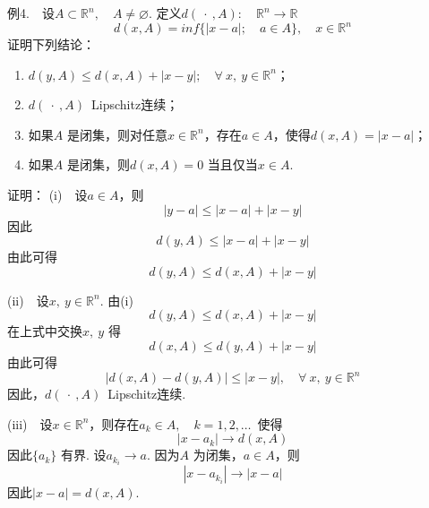 \documentclass{article}
\begin{document}
\newpage

例4.\ \ 设\(A \subset \mathbb{R}^n,\quad A \neq \varnothing \). 定义\(d(\ \cdot\ ,A):\quad \mathbb{R}^n \to \mathbb{R}\)
\begin{equation*}
    d(x,A) = inf \{| x - a |;\quad a \in A \},\quad x \in \mathbb{R}^n
\end{equation*}
证明下列结论：
\begin{enumerate}
    \item \(d(y,A) \le d(x,A) + | x - y |;\quad \forall\ x,\ y \in \mathbb{R}^n \)；
    \item \(d(\ \cdot\ ,A)\)\ Lipschitz连续；
    \item 如果\(A\) 是闭集，则对任意\(x \in \mathbb{R}^n\)，存在\(a \in A\)，使得\(d(x,A) = | x - a | \)；
    \item 如果\(A\) 是闭集，则\(d(x,A) = 0\) 当且仅当\(x \in A\).
\end{enumerate}

\vspace{10pt}

证明：\newline
(i)\ \ 设\(a \in A\)，则
\begin{equation*}
    | y - a | \le | x - a |+ | x - y |
\end{equation*}
因此
\begin{equation*}
    d(y,A) \le | x - a |+ | x - y |
\end{equation*}
由此可得
\begin{equation*}
    d(y,A) \le d(x,A) + | x - y |
\end{equation*}

(ii)\ \ 设\(x,\ y \in \mathbb{R}^n\). 由(i)
\begin{equation*}
    d(y,A) \le d(x,A) + | x - y |
\end{equation*}
在上式中交换\(x,\ y\) 得
\begin{equation*}
    d(x,A) \le d(y,A) + | x - y |
\end{equation*}
由此可得
\begin{equation*}
    | d(x,A) - d(y,A) | \le | x - y |,\quad \forall\ x,\ y \in \mathbb{R}^n
\end{equation*}
因此，\(d(\ \cdot\ ,A)\)\ Lipschitz连续.

(iii)\ \ 设\(x \in \mathbb{R}^n\)，则存在\(a_k \in A,\quad k = 1,2,\dots \)\ 使得
\begin{equation*}
    | x - a_k |\to d(x,A)
\end{equation*}
因此\(\{a_k\} \) 有界. 设\(a_{k_{i}}\to a\). 因为\(A\) 为闭集，\(a \in A\)，则
\begin{equation*}
    | x - a_{k_{i}} | \to | x - a |
\end{equation*}
因此\(|x - a|= d(x,A)\).
\end{document}
